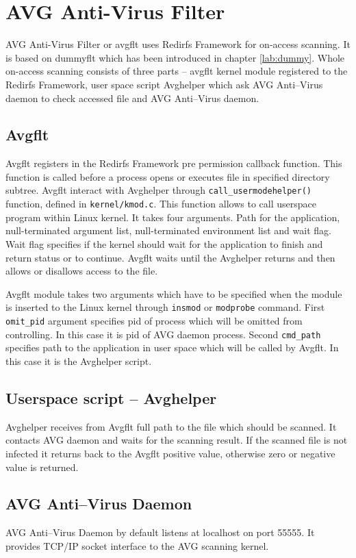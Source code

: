 \chapter{AVG Anti-Virus Filter}
AVG Anti-Virus Filter or avgflt uses Redirfs Framework for on-access scanning. It is
based on dummyflt which has been introduced in chapter \ref{lab:dummy}. Whole
on-access scanning consists of three parts -- avgflt kernel module registered to the
Redirfs Framework, user space script Avghelper which ask AVG Anti--Virus daemon to
check accessed file and AVG Anti--Virus daemon.

\section{Avgflt}
Avgflt registers in the Redirfs Framework pre permission callback function. This function is
called before a process opens or executes file in specified directory subtree. Avgflt
interact with Avghelper through \texttt{call\_usermodehelper()} function, defined in
\texttt{kernel/kmod.c}. This function allows to call userspace program within Linux
kernel. It takes four arguments. Path for the application, null-terminated argument
list, null-terminated environment list and wait flag. Wait flag specifies if the
kernel should wait for the application to finish and return status or to continue.
Avgflt waits until the Avghelper returns and then allows or disallows access to the
file.

Avgflt module takes two arguments which have to be specified when the module is
inserted to the Linux kernel through \texttt{insmod} or \texttt{modprobe} command.
First \texttt{omit\_pid} argument specifies pid of process which will be omitted from
controlling. In this case it is pid of AVG daemon process. Second \texttt{cmd\_path}
specifies path to the application in user space which will be called by Avgflt. In this
case it is the Avghelper script.

\section{Userspace script -- Avghelper}
Avghelper receives from Avgflt full path to the file which should be scanned. It
contacts AVG daemon and waits for the scanning result. If the scanned file is not infected
it returns back to the Avgflt positive value, otherwise zero or negative value is
returned.

\section{AVG Anti--Virus Daemon}
AVG Anti--Virus Daemon by default listens at localhost on port 55555. It provides
TCP/IP socket interface to the AVG scanning kernel.

